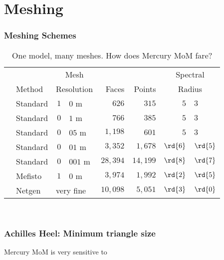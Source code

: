 % 

\section{Meshing}

\begin{frame}
	\frametitle{Meshing Schemes}
	\begin{table}[htp]
		\begin{center}
			\begin{tabular}{clr@{.}lrrr@{.}l}
					&&\multicolumn{2}{c}{Mesh}&&&  \multicolumn{2}{c}{Spectral} \\
				&Method &  \multicolumn{2}{l}{Resolution} & Faces & Points & \multicolumn{2}{c}{Radius} \\\hline
				\cmark & Standard & $1$ & $0$ m 		& $626$  		& $315$  & $5$ & $3$\\
				\cmark & Standard & $0$ & $1$ m 		& $766$ 		& $385$ & $5$ & $3$ \\
				\cmark & Standard & $0$ & $05$ m 	& $1,198$ 	& $601$ & $5$ & $3$\\\arrayrulecolor{medgray}\hline
				\xmark & Standard & $0$ & $01$ m 	& $3,352$	& 	$1,678$ & $\rd{6}$ & $\rd{5}$\\
				\xmark & Standard & $0$ & $001$ m 	& $28,394$ 	& $14,199$ & $\rd{8}$ & $\rd{7}$ \\
				\xmark & Mefisto & $1$ & $0$ m 		& $3,974$ 	& $1,992$ & $\rd{2}$ & $\rd{5}$ \\
				\xmark & Netgen &  \multicolumn{2}{l}{very fine}& $10,098$	& $5,051$  & $\rd{3}$ & $\rd{0}$\\
			\end{tabular}
		\end{center}
	\caption{One model, many meshes. How does Mercury MoM fare? }
	\label{tab:features}
	\end{table}%
\end{frame}
\
\begin{frame}
	\frametitle{Achilles Heel: Minimum triangle size}
	Mercury MoM is very sensitive to \color{red}{Spectral radius}
\end{frame}


